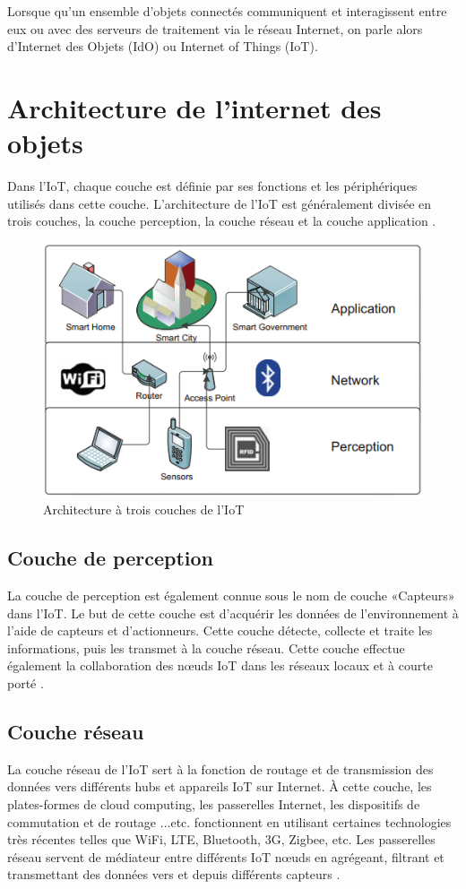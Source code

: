 Lorsque qu’un ensemble d’objets connectés communiquent et interagissent entre eux ou avec des serveurs de traitement via le réseau Internet, on parle alors d’Internet des Objets (IdO) ou Internet of Things (IoT).
\section{Architecture de l'internet des objets}
Dans l'IoT, chaque couche est définie par ses fonctions et les périphériques utilisés dans cette couche. L'architecture de l'IoT est généralement divisée en trois couches, la couche perception, la couche réseau et la couche application \cite{9}.

\begin{figure}[H]
\centering
\includegraphics[scale=1]{chap1/fig1.png}
\caption{Architecture à trois couches de l'IoT \cite{10}}
\label{fig1}
\end{figure}
\subsection{Couche de perception}
La couche de perception est également connue sous le nom de couche «Capteurs» dans l'IoT. Le but de cette couche est d'acquérir les données de l'environnement à l'aide de capteurs et d'actionneurs. Cette couche détecte, collecte et traite les informations, puis les transmet à la couche réseau. Cette couche effectue également la collaboration des nœuds IoT dans les réseaux locaux et à courte porté \cite{11}.
\subsection{Couche réseau}
La couche réseau de l'IoT sert à la fonction de routage et de transmission des données vers différents hubs et appareils IoT sur Internet. À cette couche, les plates-formes de cloud computing, les passerelles Internet, les dispositifs de commutation et de routage ...etc. fonctionnent en utilisant certaines technologies très récentes telles que WiFi, LTE, Bluetooth, 3G, Zigbee, etc. Les passerelles réseau servent de médiateur entre différents IoT nœuds en agrégeant, filtrant et transmettant des données vers et depuis différents capteurs \cite{12}.

